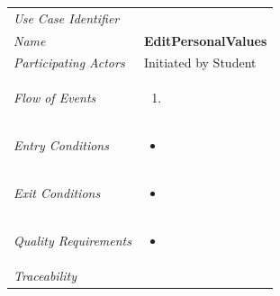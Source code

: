 \documentclass[12pt,letterpaper]{article}
\begin{document}
\begin{center}
	\begin{tabu} to 
		\toprule
		Use Case Identifier & \editpersonalvalues{} \\
		Name & {\bf EditPersonalValues} \\
		Participating Actors & Initiated by Student \\
		Flow of Events & 
	    \begin{enumerate}[topsep=-1em, leftmargin=*]
		    \item 
		\end{enumerate} \\

		Entry Conditions &
		\begin{itemize}[topsep=-1em, leftmargin=*]
		    \item 
        \end{itemize} \\

		Exit Conditions &
		\begin{itemize}[topsep=-1em, leftmargin=*]
		    \item 
        \end{itemize} \\

		Quality Requirements &
		\begin{itemize}[topsep=-1em, leftmargin=*]
		    \item 
        \end{itemize} \\

		Traceability &  \\
		\toprule
	\end{tabu}
\end{center}
\end{document}
